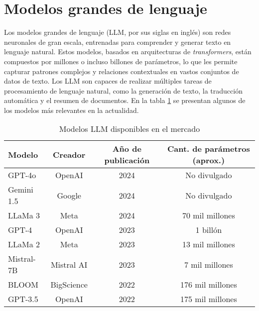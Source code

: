 \section{Modelos grandes de lenguaje}

Los modelos grandes de lenguaje (LLM, por sus siglas en inglés) son redes neuronales de gran escala, entrenadas 
para comprender y generar texto en lenguaje natural. Estos modelos, basados en arquitecturas de \textit{transformers}, 
están compuestos por millones o incluso billones de parámetros, lo que les permite capturar patrones complejos y 
relaciones contextuales en vastos conjuntos de datos de texto. Los LLM son capaces de realizar múltiples 
tareas de procesamiento de lenguaje natural, como la generación de texto, la traducción 
automática y el resumen de documentos. En la tabla \ref{tab:llms} se presentan 
algunos de los modelos más relevantes en la actualidad.

\begin{table}[h]
	\centering
	\caption[Modelos LLM disponibles en el mercado]{Modelos LLM disponibles en el mercado}
	\begin{tabular}{l c c c}    
		\toprule
		\textbf{Modelo} 	 & \textbf{Creador} 	& \textbf{Año de publicación}  & \textbf{Cant. de parámetros (aprox.)}\\
		\midrule
		GPT-4o               & OpenAI 				& 2024                         & No divulgado\\		
		Gemini 1.5      	 & Google				& 2024                         & No divulgado\\
		LLaMa 3         	 & Meta				    & 2024                         & 70 mil millones\\
        GPT-4         	     & OpenAI				& 2023                         & 1 billón\\
        LLaMa 2         	 & Meta				    & 2023                         & 13 mil millones\\
        Mistral-7B         	 & Mistral AI		    & 2023                         & 7 mil millones\\
        BLOOM         	     & BigScience		    & 2022                         & 176 mil millones\\
        GPT-3.5         	 & OpenAI				& 2022                         & 175 mil millones\\
		\bottomrule
		\hline
	\end{tabular}
	\label{tab:llms}
\end{table}

